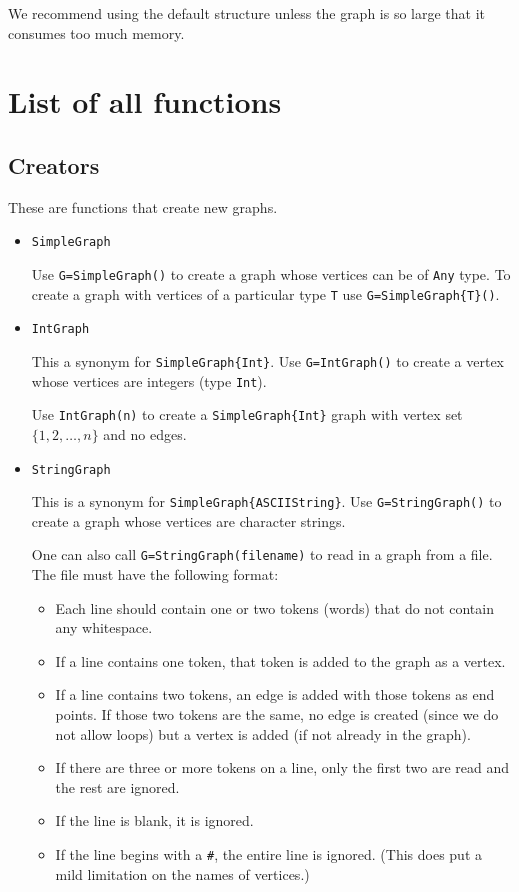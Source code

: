 \documentclass[oneside]{amsart}
\begin{document}
We recommend using the default structure unless the graph is so large
that it consumes too much memory.




\section{List of all functions}

\subsection*{Creators}

These are functions that create new graphs.

\begin{itemize}
\item \verb|SimpleGraph|

  Use \verb|G=SimpleGraph()| to create a graph whose vertices can be
  of \verb|Any| type. To create a graph with vertices of a particular
  type \verb|T| use \verb|G=SimpleGraph{T}()|.

\item \verb|IntGraph|

  This a synonym for \verb|SimpleGraph{Int}|. Use \verb|G=IntGraph()|
  to create a vertex whose vertices are integers (type \verb|Int|).

  Use \verb|IntGraph(n)| to create a \verb|SimpleGraph{Int}| graph
  with vertex set $\{1,2,\ldots,n\}$ and no edges.

\item \verb|StringGraph|

  This is a synonym for \verb|SimpleGraph{ASCIIString}|. Use
  \verb|G=StringGraph()| to create a graph whose vertices are
  character strings.

  One can also call \verb|G=StringGraph(filename)| to read in a graph
  from a file. The file must have the following format:
  \begin{itemize}
  \item Each line should contain one or two tokens (words) that do not
    contain any whitespace.
  \item If a line contains one token, that token is added to the graph
    as a vertex.
  \item If a line contains two tokens, an edge is added with those
    tokens as end points. If those two tokens are the same, no edge is
    created (since we do not allow loops) but a vertex is added (if
    not already in the graph).
  \item If there are three or more tokens on a line, only the first
    two are read and the rest are ignored.
  \item If the line is blank, it is ignored.
  \item If the line begins with a \verb|#|, the entire line is
    ignored. (This does put a mild limitation on the names of
    vertices.)
  \end{itemize}


\end{itemize}
\end{document}
